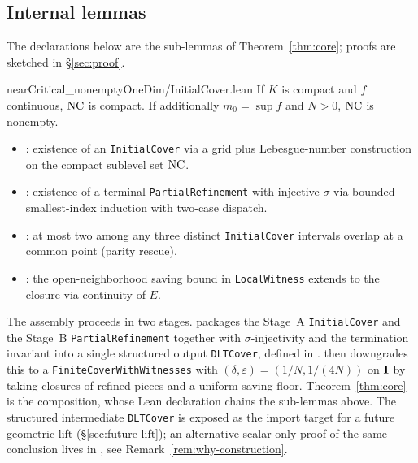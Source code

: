 \subsection{Internal lemmas}
\label{sec:internal}

The declarations below are the sub-lemmas of
Theorem~\ref{thm:core}; proofs are sketched in
\S\ref{sec:proof}.

\begin{proposition}[Compactness of $\NC$]
\label{prop:NC-compact}
%
              {nearCritical\_nonempty}{OneDim/InitialCover.lean}
If $K$ is compact and $f$ continuous, $\NC$ is compact. If
additionally $m_0 = \sup f$ and $N > 0$, $\NC$ is nonempty.
\end{proposition}

\begin{itemize}
\item {}
: existence of an \texttt{InitialCover} via a grid plus
Lebesgue-number construction on the compact sublevel set $\NC$.
\item {}
: existence of a terminal \texttt{PartialRefinement} with
injective $\sigma$ via bounded smallest-index induction with
two-case dispatch.
\item {}
: at most two among any three distinct \texttt{InitialCover}
intervals overlap at a common point (parity rescue).
\item {}
: the open-neighborhood saving bound in \texttt{LocalWitness}
extends to the closure via continuity of $E$.
\end{itemize}

The assembly proceeds in two stages.
 packages the Stage~A
\texttt{InitialCover} and the Stage~B \texttt{PartialRefinement}
together with $\sigma$-injectivity and the termination invariant
into a single structured output \texttt{DLTCover}, defined in
.
 then downgrades this
to a \texttt{FiniteCoverWithWitnesses} with
$(\delta, \varepsilon) = (1/N, 1/(4N))$ on $\mathbf{I}$ by taking closures
of refined pieces and a uniform saving floor.
Theorem~\ref{thm:core} is the composition, whose Lean declaration
 chains the
sub-lemmas above. The structured intermediate \texttt{DLTCover} is
exposed as the import target for a future geometric lift
(\S\ref{sec:future-lift}); an alternative scalar-only proof of the
same conclusion lives in
, see
Remark~\ref{rem:why-construction}.

